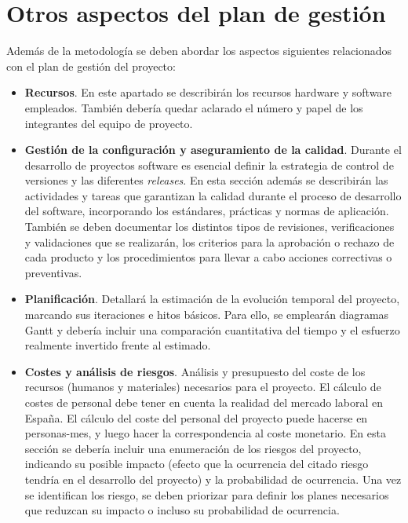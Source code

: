 \section{Otros aspectos del plan de gestión}
Además de la metodología se deben abordar los aspectos siguientes relacionados con el plan de gestión del proyecto:
\begin{itemize}
\item \textbf{Recursos}. En este apartado se describirán los recursos hardware y software empleados. También debería quedar aclarado el número y papel de los integrantes del equipo de proyecto.

\item \textbf{Gestión de la configuración y aseguramiento de la calidad}. Durante el desarrollo de proyectos software es esencial definir la estrategia de control de versiones y las diferentes \emph{releases}. En esta sección además se describirán las actividades y tareas que garantizan la calidad durante el proceso de desarrollo del software, incorporando los estándares, prácticas y normas de aplicación. También se deben documentar los distintos tipos de revisiones, verificaciones y validaciones que se realizarán, los criterios para la aprobación o rechazo de cada producto y los procedimientos para llevar a cabo acciones correctivas o preventivas.

\item \textbf{Planificación}. Detallará la estimación de la evolución temporal del proyecto, marcando sus iteraciones e hitos básicos. Para ello, se emplearán diagramas Gantt y debería incluir una comparación cuantitativa del tiempo y el esfuerzo realmente invertido frente al estimado.

\item \textbf{Costes y análisis de riesgos}. Análisis y presupuesto del coste de los recursos (humanos y materiales) necesarios para el proyecto. El cálculo de costes de personal debe tener en cuenta la realidad del mercado laboral en España. El cálculo del coste del personal del proyecto puede hacerse en personas-mes, y luego hacer la correspondencia al coste monetario. En esta sección se debería incluir una enumeración de los riesgos del proyecto, indicando su posible impacto (efecto que la ocurrencia del citado riesgo tendría en el desarrollo del proyecto) y la probabilidad de ocurrencia. Una vez se identifican los riesgo, se deben priorizar para definir los planes necesarios que reduzcan su impacto o incluso su probabilidad de ocurrencia.
\end{itemize}

